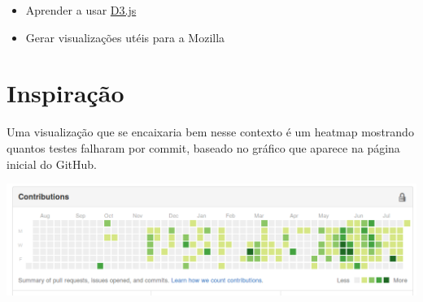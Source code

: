\documentclass[11pt]{article}
\begin{document}
\begin{itemize}
\item Aprender a usar \href{http://d3js.org/}{D3.js}
\item Gerar visualizações utéis para a Mozilla
\end{itemize}

\section{Inspiração}
\label{sec-6}

Uma visualização que se encaixaria bem nesse contexto é um heatmap
mostrando quantos testes falharam por commit, baseado no gráfico que
aparece na página inicial do GitHub.

\href{http://github.com/adusca}{\includegraphics[width=.9\linewidth]{github-heatmap.png}}
\end{document}
